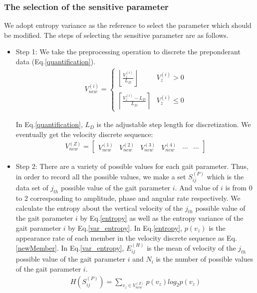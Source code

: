 \subsubsection{The selection of the sensitive parameter}

We adopt entropy variance as the reference to select the parameter which should be modified. The steps of selecting the sensitive parameter are as follows.

\begin{itemize}
	\item Step 1: We take the preprocessing operation to discrete the preponderant data (Eq.\ref{quantification}).
	\begin{eqnarray}\label{quantification}
	V_{new}^{(i)}=\left\{
	\begin{array}{lr}
	\left \lfloor \frac{V_{z}^{(i)}}{L_{D}} \right \rfloor&V_{z}^{(i)}> 0\\
	\\
	\left \lceil \frac{V_{z}^{(i)}-L_{D}}{L_{D}} \right \rceil&V_{z}^{(i)}\leq 0
	\end{array}
	\right.
	\end{eqnarray}
	
	In Eq.\ref{quantification}, $L_{D}$ is the adjustable step length for discretization. We eventually get the velocity discrete sequence:
	\begin{eqnarray}\label{newMember}
	V_{new}^{(Z)}=\begin{bmatrix}
	V_{new}^{(1)} & V_{new}^{(2)} & V_{new}^{(3)} & V_{new}^{(4)} & \cdots & \cdots
	\end{bmatrix}
	\end{eqnarray}
	
	\item Step 2: There are a variety of possible values for each gait parameter. Thus, in order to record all the possible values, we make a set $S_{ij}^{(P)}$ which is the data set of $j_{th}$ possible value of the gait parameter $i$. And value of $i$ is from 0 to 2 corresponding to amplitude, phase and angular rate respectively. We calculate the entropy about the vertical velocity of the $j_{th}$ possible value of the gait parameter $i$ by Eq.\ref{entropy} as well as the entropy variance of the gait parameter $i$ by Eq.\ref{var_entropy}. In Eq.\ref{entropy}, $p(v_{z})$ is the appearance rate of each member in the velocity discrete sequence as Eq.\ref{newMember}. In Eq.\ref{var_entropy}, $E_{ij}^{(H)}$ is the mean of velocity of  the $j_{th}$ possible value of the gait parameter $i$ and $N_{i}$ is the number of possible values of the gait parameter $i$.
	\begin{eqnarray}\label{entropy}
	H(S_{ij}^{(P)})=\sum _{v_{z}\in V_{new}^{(Z)}}p(v_{z})log_{2}p(v_{z})
	\end{eqnarray}
	

\end{itemize}
